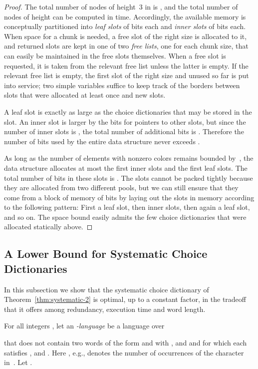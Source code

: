 \documentclass[envcountsame,envcountsect,undated,nolinenumbers]{lnthi}
\begin{document}
\begin{proof}
The total number of nodes of height~3 in 
is , and
the total number  of nodes of height
 can be computed in  time.
Accordingly, the available memory is conceptually
partitioned into  \emph{leaf slots}
of  bits each
and  \emph{inner slots}
of  bits each.
When space for a chunk is needed, a free slot of
the right size is allocated to it, and returned
slots are kept in one of two \emph{free lists},
one for each chunk size, that can
easily be maintained in the free slots themselves.
When a free slot is requested, it is taken from
the relevant free list unless the latter is empty.
If the relevant free list is empty, the first
slot of the right size and
unused so far is put into service; two
simple variables suffice to keep track of the
borders between slots that were allocated at least
once and new slots.

A leaf slot is exactly as large as the choice dictionaries
that may be stored in the slot.
An inner slot is larger by the  bits
for pointers to other slots, but since the number
of inner slots is ,
the total number of
additional bits is .
Therefore the number of bits used by the entire
data structure never exceeds
.

As long as the number of elements with
nonzero colors remains bounded by~,
the data structure allocates at most the first
 inner slots and the first  leaf slots.
The total number of bits in these slots is
.
The slots cannot be packed tightly because they
are allocated from two different pools, but we can
still ensure that they come from a block of
memory of  bits by
laying out the slots in memory according to
the following pattern:
First a leaf slot, then  inner slots, then
again a leaf slot, and so on.
The space bound easily admits the few choice
dictionaries that were allocated statically above.
\end{proof}

\subsection{A Lower Bound for Systematic Choice Dictionaries}
\label{subsec:lower}

In this subsection we show that the systematic choice
dictionary of Theorem~\ref{thm:systematic-2} is optimal,
up to a constant factor, in the tradeoff that it offers
among redundancy, execution time and word length.

For all integers , let an
\emph{-language} be a
language  over

that does not contain two words of the
form  and  with
, 
and  and
for which each
 satisfies , 
and .
Here , e.g., denotes the number
of occurrences of the character  in~.
Let .
\end{document}
